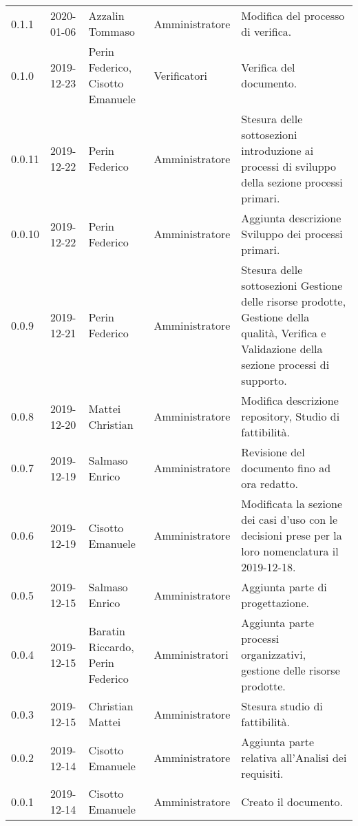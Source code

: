 {\begin{longtable}{C{2cm} C{2cm}  C{3cm}  C{3cm} C{4.5cm}}
0.1.1 & 2020-01-06 & Azzalin Tommaso & Amministratore & Modifica del processo di verifica. \\

0.1.0 & 2019-12-23 & Perin Federico, Cisotto Emanuele & Verificatori & Verifica del documento. \\

0.0.11 & 2019-12-22 & Perin Federico & Amministratore & Stesura delle sottosezioni introduzione ai processi di sviluppo della sezione processi primari. \\

0.0.10 & 2019-12-22 & Perin Federico  & Amministratore & Aggiunta descrizione Sviluppo dei processi primari. \\

0.0.9 & 2019-12-21 & Perin Federico & Amministratore & Stesura delle sottosezioni Gestione delle risorse prodotte, Gestione della qualità, Verifica e Validazione della sezione processi di supporto. \\

0.0.8 & 2019-12-20 & Mattei Christian & Amministratore & Modifica descrizione repository, Studio di fattibilità. \\

0.0.7 & 2019-12-19 & Salmaso Enrico & Amministratore & Revisione del documento fino ad ora redatto. \\

0.0.6 & 2019-12-19 & Cisotto Emanuele & Amministratore & Modificata la sezione dei casi d’uso con le decisioni prese per la loro nomenclatura il 2019-12-18. \\

0.0.5 & 2019-12-15 & Salmaso Enrico & Amministratore & Aggiunta parte di progettazione. \\

0.0.4 & 2019-12-15 & Baratin Riccardo, Perin Federico  & Amministratori & Aggiunta parte processi organizzativi, gestione delle risorse prodotte. \\

0.0.3 & 2019-12-15 & Christian Mattei & Amministratore & Stesura studio di fattibilità. \\

0.0.2 & 2019-12-14 & Cisotto Emanuele & Amministratore & Aggiunta parte relativa all’Analisi dei requisiti. \\

0.0.1 & 2019-12-14 & Cisotto Emanuele & Amministratore & Creato il documento. \\
		
\end{longtable}
}